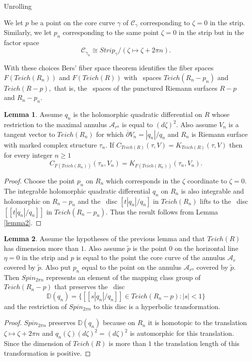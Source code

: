 \documentclass[12pt]{amsart}
\theoremstyle{remark}
\theoremstyle{definition}
\theoremstyle{definition}
\newtheorem{lemma}{Lemma}
\begin{document}
\begin{section}{Unrolling}
 
 We let $p$ be a point on the core curve $\gamma$ of ${\mathcal C}_{\gamma}$ corresponding to $\zeta = 0$ in the strip.  Similarly, we let 
 $p_n$ corresponding to the same point $\zeta=0$ in the strip but in the factor space 
 $$ {\mathcal C}_{\gamma_n} \cong Strip_{\gamma}/(\zeta \mapsto \zeta+2\pi n).$$
 
 
 With these choices  Bers' fiber space theorem  identifies the fiber spaces $F(Teich(R_n))$ and $F(Teich(R))$ with \te\ spaces $Teich(R_n-p_n)$ and $Teich(R-p),$ that is, the \te\ spaces of the punctured Riemann surfaces $R-p$ and $R_n-p_n.$
 
 \begin{lemma}\label{lemmaseven} Assume $q_n$ is the holomorphic quadratic differential on $R$ whose restriction to the maximal annulus ${\mathcal A}_{r^n}$ is equal to $(d\zeta)^2.$ Also assume $V_n$ is a tangent vector to $Teich(R_n)$ for which 
 $\overline{\partial} V_n = |q_n|/q_n$ and $R_n$ is  Riemann surface with marked complex structure $\tau_n.$ If $C_{Teich(R)}(\tau,V)=K_{Teich(R)}(\tau,V)$ then for every integer $n \geq 1$
 $$C_{F(Teich(R_n))}(\tau_n,V_n)=K_{F(Teich(R_n))}(\tau_n,V_n).$$
 \end{lemma}
 \begin{proof} Choose the point $p_n$ on $R_n$ which corresponds in the $\zeta$ coordinate to $\zeta=0.$   
 The integrable holomorphic quadratic differential $q_n$ on $R_n$ is also integrable and holomorphic on $R_n-p_n$ and the \te\ disc $[t|q_n|/q_n]$ in $Teich(R_n)$ lifts to the \te\ disc
 $[[t|q_n|/q_n]]$ in $Teich(R_n-p_n).$  Thus the result follows from Lemma \ref{lemma2}.
 \end{proof}
 
 


  


\begin{lemma}\label{hyperbolicity} Assume the hypotheses of the previous lemma and that $Teich(R)$ has dimension more than $1.$  Also assume $\tilde{p}$ is the point $0$ on the horizontal line $\eta=0$ in the strip and $p$ is equal to the point the core curve of the annulus ${\mathcal A}_r$ covered by $\tilde{p}.$  Also put $p_n$ equal to the point on the annulus ${\mathcal A}_{r^n}$ covered by $\tilde{p}.$   Then $Spin_{2 \pi n}$ represents 
an element of the mapping class group of $Teich(R_n-p)$ that preserves the \te\ disc 
$${\mathbb D}(q_n)=\{[[s|q_n|/q_n]] \in Teich(R_n-p): |s|<1\}$$  and the restriction of  $Spin_{2\pi n}$  to this disc is a hyperbolic transformation.
\end{lemma}
 \begin{proof}
 $Spin_{2 \pi n}$ preserves ${\mathbb D}(q_n)$ because on $R_n$ it is homotopic to the translation $\zeta \mapsto \zeta+ 2 \pi n$ and $q_n(\zeta) (d \zeta)^2= (d \zeta)^2$ is automorphic for this translation.  Since the dimension of $Teich(R)$ is more than $1$ the translation length of this transformation is positive.
 

\end{proof}
\end{section}
\end{document}
